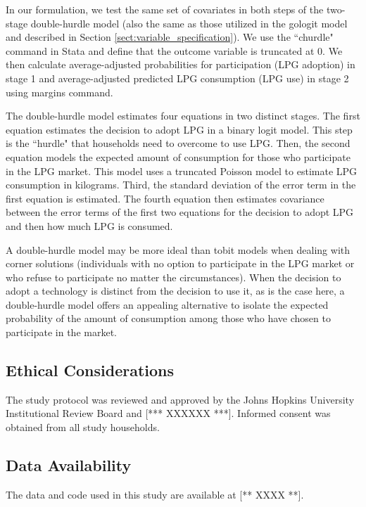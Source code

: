 \documentclass[11pt,english]{article}
\theoremstyle{plain} \newtheorem{claim}{Claim}
\theoremstyle{plain} \newtheorem{prop}{Proposition}
\theoremstyle{plain} \newtheorem{hypo}{Hypothesis}
\begin{document}
In our formulation, we test the same set of covariates in both steps of the two-stage double-hurdle model (also the same as those utilized in the gologit model and described in Section \ref{sect:variable_specification}). We use the ``churdle" command in Stata and define that the outcome variable is truncated at 0. We then calculate average-adjusted probabilities for participation (LPG adoption) in stage 1 and average-adjusted predicted LPG consumption (LPG use) in stage 2 using margins command.

The double-hurdle model estimates four equations in two distinct stages. The first equation estimates the decision to adopt LPG in a binary logit model. This step is the ``hurdle" that households need to overcome to use LPG. Then, the second equation models the expected amount of consumption for those who participate in the LPG market. This model uses a truncated Poisson model to estimate LPG consumption in kilograms. Third, the standard deviation of the error term in the first equation is estimated. The fourth equation then estimates covariance between the error terms of the first two equations for the decision to adopt LPG and then how much LPG is consumed.

A double-hurdle model may be more ideal than tobit models when dealing with corner solutions (individuals with no option to participate in the LPG market or who refuse to participate no matter the circumstances)\cite{Garcia2013}. When the decision to adopt a technology is distinct from the decision to use it, as is the case here, a double-hurdle model offers an appealing alternative to isolate the expected probability of the amount of consumption among those who have chosen to participate in the market. 

\subsection*{Ethical Considerations}

The study protocol was reviewed and approved by the Johns Hopkins University Institutional Review Board and [*** XXXXXX ***]. Informed consent was obtained from all study households.

\subsection*{Data Availability}

The data and code used in this study are available at [** XXXX **].

\clearpage



\end{document}
